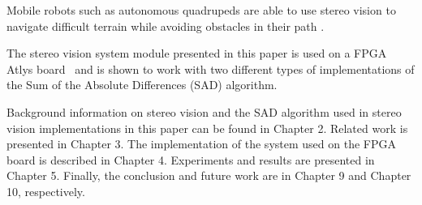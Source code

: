 Mobile robots such as autonomous quadrupeds are able to use stereo vision to navigate difficult terrain while avoiding obstacles in their path \cite{quadRobot}.

The stereo vision system module presented in this paper is used on a FPGA Atlys board~\cite{atlysBoard} and is shown to work with two different types of implementations of the Sum of the Absolute Differences (SAD) algorithm. 

Background information on stereo vision and the SAD algorithm used in stereo vision implementations in this paper can be found in Chapter 2. Related work is presented in Chapter 3. The implementation of the system used on the FPGA board is described in Chapter 4. Experiments and results are presented in Chapter 5. Finally, the conclusion and future work are in Chapter 9 and Chapter 10, respectively.